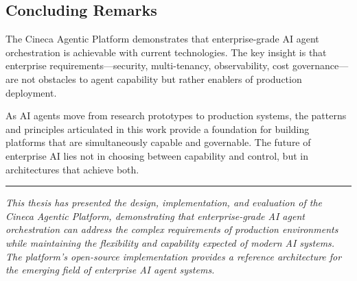 \subsection{Concluding Remarks}

The Cineca Agentic Platform demonstrates that enterprise-grade AI agent orchestration is achievable with current technologies. The key insight is that enterprise requirements---security, multi-tenancy, observability, cost governance---are not obstacles to agent capability but rather enablers of production deployment.

As AI agents move from research prototypes to production systems, the patterns and principles articulated in this work provide a foundation for building platforms that are simultaneously capable and governable. The future of enterprise AI lies not in choosing between capability and control, but in architectures that achieve both.

\vspace{1em}
\noindent\rule{\textwidth}{0.4pt}
\vspace{0.5em}

\textit{This thesis has presented the design, implementation, and evaluation of the Cineca Agentic Platform, demonstrating that enterprise-grade AI agent orchestration can address the complex requirements of production environments while maintaining the flexibility and capability expected of modern AI systems. The platform's open-source implementation provides a reference architecture for the emerging field of enterprise AI agent systems.}


